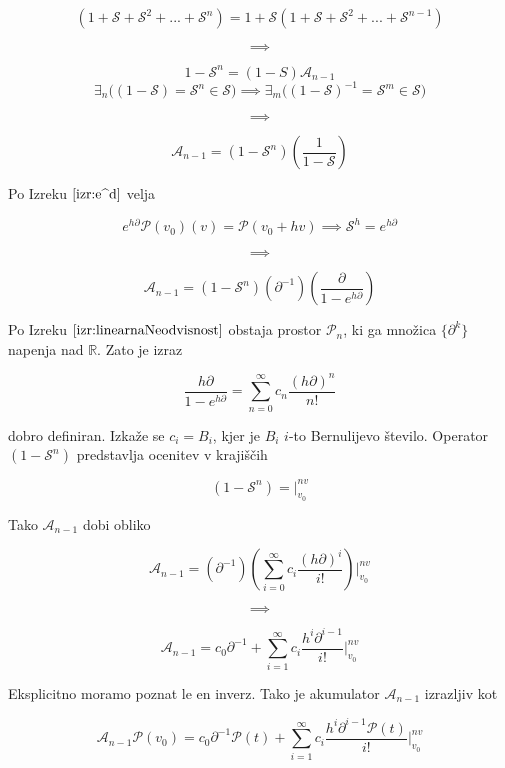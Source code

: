 \documentclass{article}
\newcommand{\RR}{\mathbb{R}}
\newcommand{\Shift}{\mathcal{S}}
\newcommand{\dP}{\mathcal{P}}
\newcommand{\D}{\partial}
\begin{document}
   $$(1+\Shift+\Shift^2+...+\Shift^n)=1+\Shift(1+\Shift+\Shift^2+...+\Shift^{n-1})$$
   
   $$\implies$$
   
   $$1-\Shift^n=(1-S)\mathcal{A}_{n-1}$$
   $$\exists_n\Big((1-\Shift)=\Shift^n\in\Shift\Big)\implies \exists_m\Big((1-\Shift)^{-1}=\Shift^m\in \Shift\Big)$$
   
   $$\implies$$
   
   $$\mathcal{A}_{n-1}=(1-\Shift^n)(\frac{1}{1-\Shift})$$
   
   Po Izreku $\ref{izr:e^d}$ velja
   
   $$e^{h\D}\dP(v_0)(v)=\dP(v_0+hv)\implies \Shift^h=e^{h\D}$$
   
   $$\implies$$
   
   $$\mathcal{A}_{n-1}=(1-\Shift^n)(\D^{-1})(\frac{\D}{1-e^{h\D}})$$
   
   Po Izreku $\ref{izr:linearnaNeodvisnost}$  obstaja prostor $\dP_n$, ki ga množica $\{\D^k\}$ napenja nad $\RR$. Zato je izraz   
     
    \begin{equation}
    	\frac{h\D}{1-e^{h\D}}=\sum\limits_{n=0}^{\infty}c_n\frac{(h\D)^n}{n!}
    \end{equation}
    
    dobro definiran. Izkaže se $c_i=B_i$, kjer je $B_i$ $i$-to Bernulijevo število. Operator $(1-\Shift^n)$ predstavlja ocenitev v krajiščih
    
    $$(1-\Shift^n)=\Bigg\vert_{v_0}^{nv}$$
    
    Tako $\mathcal{A}_{n-1}$ dobi obliko
    
    $$\mathcal{A}_{n-1}=(\D^{-1})(\sum\limits_{i=0}^{\infty}c_i\frac{(h\D)^i}{i!})\Bigg\vert_{v_0}^{nv}$$
    
    $$\implies$$
    
    \begin{equation}
    \mathcal{A}_{n-1}=c_0\D^{-1}+\sum\limits_{i=1}^{\infty}c_i\frac{h^i\D^{i-1}}{i!}\Bigg\vert_{v_0}^{nv}
    \end{equation}
    
    Eksplicitno moramo poznat le en inverz. Tako je akumulator $\mathcal{A}_{n-1}$ izrazljiv kot
    
    \begin{equation}
    	\mathcal{A}_{n-1}\dP(v_0)=c_0\D^{-1}\dP(t)+\sum\limits_{i=1}^{\infty}c_i\frac{h^i\D^{i-1}\dP(t)}{i!}\Bigg\vert_{v_0}^{nv}
    \end{equation}
    
\end{document}
